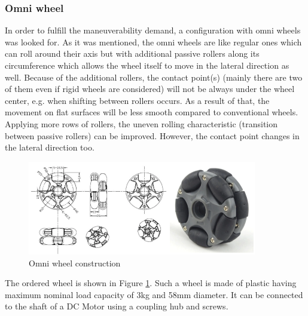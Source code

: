 \documentclass[12pt,english,twoside]{article}
\begin{document}
\subsubsection{Omni wheel}
In order to fulfill the maneuverability demand, a configuration with omni wheels was looked for. As it was mentioned, the omni wheels are like regular ones which can roll around their axis but with additional passive rollers along its circumference which allows the wheel itself to move in the lateral direction as well. Because of the additional rollers, the contact point(s) (mainly there are two of them even if rigid wheels are considered) will not be always under the wheel center, e.g. when shifting between rollers occurs. As a result of that, the movement on flat surfaces will be less smooth compared to conventional wheels. Applying more rows of rollers, the uneven rolling characteristic (transition between passive rollers) can be improved. However, the contact point changes in the lateral direction too. \cite{owp1}
\begin{figure}[htb!]
	\centering
	\includegraphics[width=10cm]{figures/omni_wheel.png}
	\caption{Omni wheel construction}
	\label{omni_wheel}
\end{figure}
The ordered wheel is shown in Figure \ref{omni_wheel}. Such a wheel is made of plastic having maximum nominal load capacity of 3kg and 58mm diameter. It can be connected to the shaft of a DC Motor using a coupling hub and screws.
\end{document}
